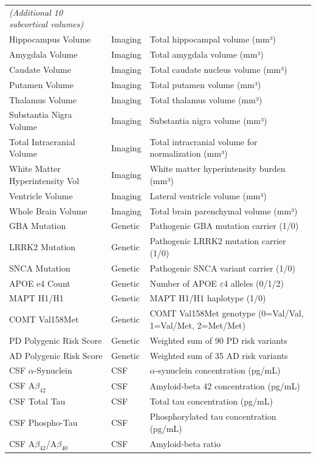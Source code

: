 \documentclass[11pt]{article}
\begin{document}
\begin{longtable}{p{} p{} p{}}
\textit{(Additional 10 subcortical volumes)} & & \\
Hippocampus Volume & Imaging & Total hippocampal volume (mm³) \\
Amygdala Volume & Imaging & Total amygdala volume (mm³) \\
Caudate Volume & Imaging & Total caudate nucleus volume (mm³) \\
Putamen Volume & Imaging & Total putamen volume (mm³) \\
Thalamus Volume & Imaging & Total thalamus volume (mm³) \\
Substantia Nigra Volume & Imaging & Substantia nigra volume (mm³) \\
Total Intracranial Volume & Imaging & Total intracranial volume for normalization (mm³) \\
White Matter Hyperintensity Vol & Imaging & White matter hyperintensity burden (mm³) \\
Ventricle Volume & Imaging & Lateral ventricle volume (mm³) \\
Whole Brain Volume & Imaging & Total brain parenchymal volume (mm³) \\

GBA Mutation & Genetic & Pathogenic GBA mutation carrier (1/0) \\
LRRK2 Mutation & Genetic & Pathogenic LRRK2 mutation carrier (1/0) \\
SNCA Mutation & Genetic & Pathogenic SNCA variant carrier (1/0) \\
APOE e4 Count & Genetic & Number of APOE $\varepsilon$4 alleles (0/1/2) \\
MAPT H1/H1 & Genetic & MAPT H1/H1 haplotype (1/0) \\
COMT Val158Met & Genetic & COMT Val158Met genotype (0=Val/Val, 1=Val/Met, 2=Met/Met) \\
PD Polygenic Risk Score & Genetic & Weighted sum of 90 PD risk variants \\
AD Polygenic Risk Score & Genetic & Weighted sum of 35 AD risk variants \\

CSF $\alpha$-Synuclein & CSF & $\alpha$-synuclein concentration (pg/mL) \\
CSF A$\beta_{42}$ & CSF & Amyloid-beta 42 concentration (pg/mL) \\
CSF Total Tau & CSF & Total tau concentration (pg/mL) \\
CSF Phospho-Tau & CSF & Phosphorylated tau concentration (pg/mL) \\
CSF A$\beta_{42}$/A$\beta_{40}$ & CSF & Amyloid-beta ratio \\

\end{longtable}
\end{document}
